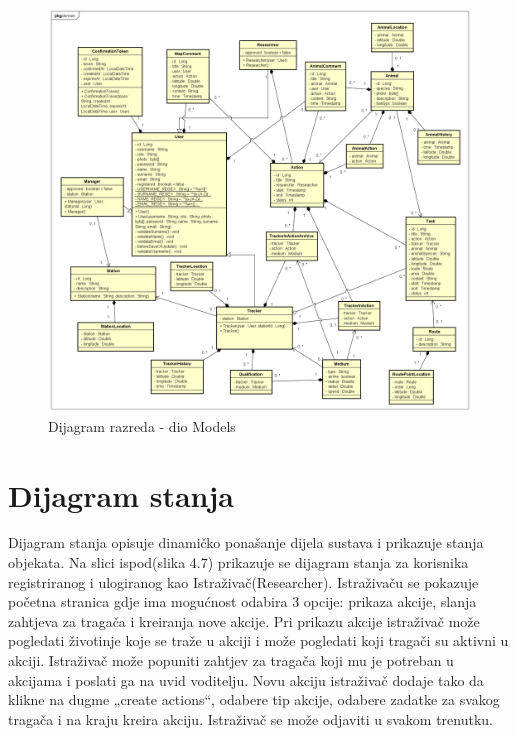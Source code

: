 		\eject
		
		\begin{figure}[H] %
			\centering
			\includegraphics[width=\textwidth]{slike/modeldiagram.png}
			\caption{Dijagram razreda - dio Models}
			\label{fig:Modelrdiagram}
		\end{figure}
		
		\eject
		
		\section{Dijagram stanja}
			
			
			\noindent Dijagram stanja opisuje dinamičko ponašanje dijela sustava i prikazuje stanja objekata. Na slici ispod(slika 4.7) prikazuje se dijagram stanja za korisnika registriranog i ulogiranog kao Istraživač(Researcher).  Istraživaču se pokazuje početna stranica gdje ima mogućnost odabira 3 opcije: prikaza akcije, slanja zahtjeva za tragača i kreiranja nove akcije. Pri prikazu akcije istraživač može pogledati životinje koje se traže u akciji i može pogledati koji tragači su aktivni u akciji. Istraživač može popuniti zahtjev za tragača koji mu je potreban u akcijama i poslati ga na uvid voditelju. Novu akciju istraživač dodaje tako da klikne na dugme „create actions“, odabere tip akcije, odabere zadatke za svakog tragača i na kraju kreira akciju. Istraživač se može odjaviti u svakom trenutku.
			
